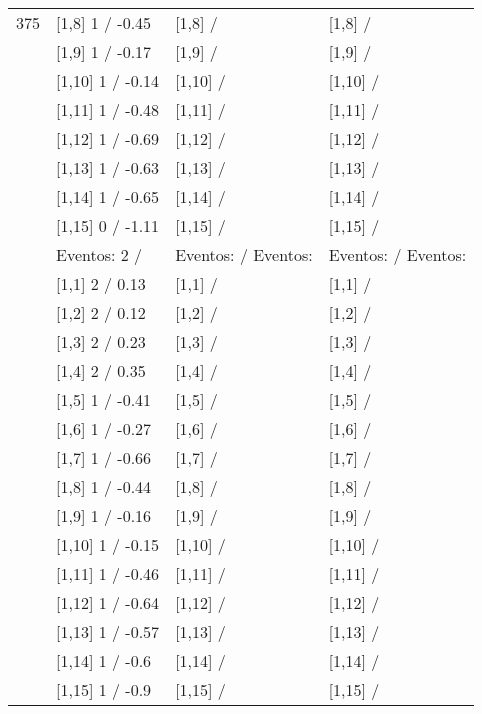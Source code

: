 \begin{table}
\begin{tabular}[t]{llll}
375 & {}[1,8] 1  / -0.45 & {}[1,8]  / & {}[1,8]  /\\
\addlinespace
 & {}[1,9] 1  / -0.17 & {}[1,9]  / & {}[1,9]  /\\
 & {}[1,10] 1  / -0.14 & {}[1,10]  / & {}[1,10]  /\\
 & {}[1,11] 1  / -0.48 & {}[1,11]  / & {}[1,11]  /\\
 & {}[1,12] 1  / -0.69 & {}[1,12]  / & {}[1,12]  /\\
 & {}[1,13] 1  / -0.63 & {}[1,13]  / & {}[1,13]  /\\
\addlinespace
 & {}[1,14] 1  / -0.65 & {}[1,14]  / & {}[1,14]  /\\
 & {}[1,15] 0  / -1.11 & {}[1,15]  / & {}[1,15]  /\\
 & Eventos:  2 / & Eventos:   / Eventos: & Eventos:   / Eventos:\\
 & {}[1,1] 2  / 0.13 & {}[1,1]  / & {}[1,1]  /\\
 & {}[1,2] 2  / 0.12 & {}[1,2]  / & {}[1,2]  /\\
\addlinespace
 & {}[1,3] 2  / 0.23 & {}[1,3]  / & {}[1,3]  /\\
 & {}[1,4] 2  / 0.35 & {}[1,4]  / & {}[1,4]  /\\
 & {}[1,5] 1  / -0.41 & {}[1,5]  / & {}[1,5]  /\\
 & {}[1,6] 1  / -0.27 & {}[1,6]  / & {}[1,6]  /\\
 & {}[1,7] 1  / -0.66 & {}[1,7]  / & {}[1,7]  /\\
\addlinespace
500 & {}[1,8] 1  / -0.44 & {}[1,8]  / & {}[1,8]  /\\
 & {}[1,9] 1  / -0.16 & {}[1,9]  / & {}[1,9]  /\\
 & {}[1,10] 1  / -0.15 & {}[1,10]  / & {}[1,10]  /\\
 & {}[1,11] 1  / -0.46 & {}[1,11]  / & {}[1,11]  /\\
 & {}[1,12] 1  / -0.64 & {}[1,12]  / & {}[1,12]  /\\
\addlinespace
 & {}[1,13] 1  / -0.57 & {}[1,13]  / & {}[1,13]  /\\
 & {}[1,14] 1  / -0.6 & {}[1,14]  / & {}[1,14]  /\\
 & {}[1,15] 1  / -0.9 & {}[1,15]  / & {}[1,15]  /\\
\bottomrule
\end{tabular}
\end{table}
